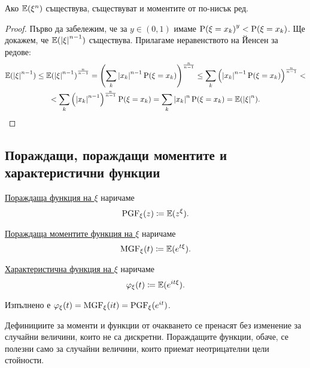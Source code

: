 \documentclass[numbers=endperiod, DIV=15, bibliography=totocnumbered]{scrartcl}
\begin{document}
\begin{proposition}\label{thm:lower-order-moments}
  Ако $\mathbb{E}(\xi^n)$ съществува, съществуват и моментите от по-нисък ред.
\end{proposition}
\begin{proof}
  Първо да забележим, че за $y \in (0, 1)$ имаме ${\operatorname{P}(\xi = x_k)}^y < \operatorname{P}(\xi = x_k)$. Ще докажем, че $\mathbb{E}({\left\vert \xi \right\vert}^{n-1})$ съществува. Прилагаме неравенството на Йенсен за редове:
  \begin{multline*}
    \mathbb{E}({\left\vert \xi \right\vert}^{n-1})
    \leq
    {\mathbb{E}({\left\vert \xi \right\vert}^{n-1})}^{\frac n {n-1}}
    =
    {\left( \sum_k {\left\vert x_k \right\vert}^{n-1} \operatorname{P}(\xi = x_k) \right)}^{\frac n {n-1}}
    \leq
    \sum_k {\left({\left\vert x_k \right\vert}^{n-1} \operatorname{P}(\xi = x_k) \right)}^{\frac n {n-1}}
    < \\ <
    \sum_k {\left({\left\vert x_k \right\vert}^{n-1}\right)}^{\frac n {n-1}} \operatorname{P}(\xi = x_k)
    =
    \sum_k {\left\vert x_k \right\vert}^n \operatorname{P}(\xi = x_k)
    =
    \mathbb{E}({\left\vert \xi \right\vert}^n).
  \end{multline*}
\end{proof}

\subsection{Пораждащи, пораждащи моментите и характеристични функции}

\begin{definition}
  \underline{Пораждаща функция на $\xi$} наричаме
  \begin{displaymath}
    \operatorname{PGF}_\xi (z) \coloneqq \mathbb{E}(z^\xi).
  \end{displaymath}

  \underline{Пораждаща моментите функция на $\xi$} наричаме
  \begin{displaymath}
    \operatorname{MGF}_\xi (t) \coloneqq \mathbb{E}(e^{t\xi}).
  \end{displaymath}

  \underline{Характеристична функция на $\xi$} наричаме
  \begin{displaymath}
    \varphi_\xi (t) \coloneqq \mathbb{E}(e^{it\xi}).
  \end{displaymath}

  Изпълнено е $\varphi_\xi(t) = \operatorname{MGF}_\xi(it) = \operatorname{PGF}_\xi(e^{it})$.
\end{definition}

\begin{note}
  Дефинициите за моменти и функции от очакването се пренасят без изменение за случайни величини, които не са дискретни. Пораждащите функции, обаче, се полезни само за случайни величини, които приемат неотрицателни цели стойности.
\end{note}
\end{document}
